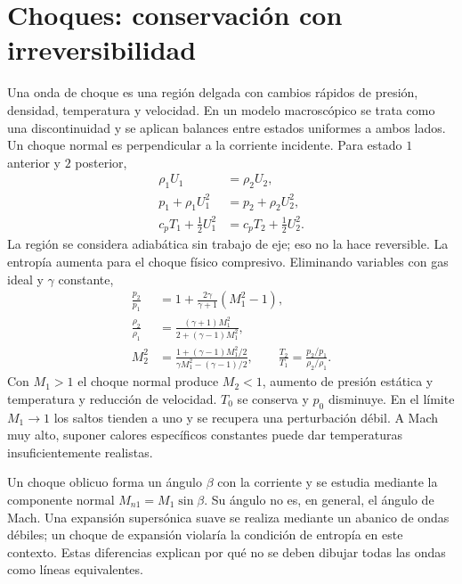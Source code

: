 \section{Choques: conservación con irreversibilidad}
Una onda de choque es una región delgada con cambios rápidos de presión, densidad, temperatura y velocidad. En un modelo macroscópico se trata como una discontinuidad y se aplican balances entre estados uniformes a ambos lados. Un choque normal es perpendicular a la corriente incidente. Para estado $1$ anterior y $2$ posterior,
\begin{align}
 \rho_1U_1&=\rho_2U_2,\\
 p_1+\rho_1U_1^2&=p_2+\rho_2U_2^2,\\
 c_pT_1+\tfrac12U_1^2&=c_pT_2+\tfrac12U_2^2.
\end{align}
La región se considera adiabática sin trabajo de eje; eso no la hace reversible. La entropía aumenta para el choque físico compresivo. Eliminando variables con gas ideal y $\gamma$ constante,
\begin{align}
 \frac{p_2}{p_1}&=1+\frac{2\gamma}{\gamma+1}(M_1^2-1),\label{eq:08-shock-p}\\
 \frac{\rho_2}{\rho_1}&=\frac{(\gamma+1)M_1^2}{2+(\gamma-1)M_1^2},\\
 M_2^2&=\frac{1+(\gamma-1)M_1^2/2}{\gamma M_1^2-(\gamma-1)/2},\qquad
 \frac{T_2}{T_1}=\frac{p_2/p_1}{\rho_2/\rho_1}.
\end{align}
Con $M_1>1$ el choque normal produce $M_2<1$, aumento de presión estática y temperatura y reducción de velocidad. $T_0$ se conserva y $p_0$ disminuye. En el límite $M_1\to1$ los saltos tienden a uno y se recupera una perturbación débil. A Mach muy alto, suponer calores específicos constantes puede dar temperaturas insuficientemente realistas.

Un choque oblicuo forma un ángulo $\beta$ con la corriente y se estudia mediante la componente normal $M_{n1}=M_1\sin\beta$. Su ángulo no es, en general, el ángulo de Mach. Una expansión supersónica suave se realiza mediante un abanico de ondas débiles; un choque de expansión violaría la condición de entropía en este contexto. Estas diferencias explican por qué no se deben dibujar todas las ondas como líneas equivalentes.

